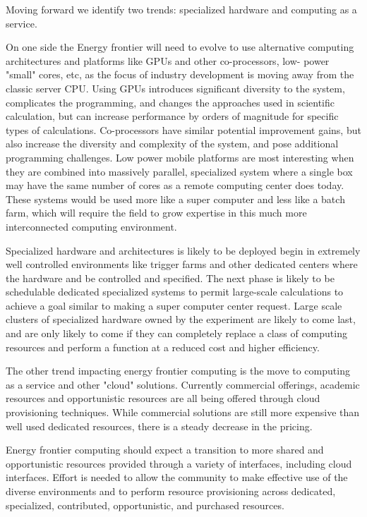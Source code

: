 Moving forward we identify two trends: specialized hardware and computing as a service.

On one side the Energy frontier will need to evolve to use alternative
computing architectures and platforms like GPUs and other co-processors, low-
power "small" cores, etc, as the focus of industry development is moving away
from the classic server CPU.  Using GPUs introduces significant diversity to
the system, complicates the programming, and changes the approaches used in
scientific calculation, but can increase performance by orders of magnitude
for specific types of calculations.  Co-processors have similar potential
improvement gains, but also increase the diversity and complexity of the system, and pose
additional programming challenges.  Low power mobile platforms are most
interesting when they are combined into massively parallel, specialized system
where a single box may have the same number of cores as a remote computing
center does today.  These systems would be used more like a super computer and
less like a batch farm, which will require the field to grow expertise in this
much more interconnected computing environment.

Specialized hardware and architectures is likely to be deployed begin in
extremely well controlled environments like trigger farms and other dedicated
centers where the hardware and be controlled and specified. The next phase is
likely to be schedulable dedicated specialized systems to permit large-scale
calculations to achieve a goal similar to making a super computer center
request.  Large scale clusters of specialized hardware owned by the experiment
are likely to come last, and are only likely to come if they can completely
replace a class of computing resources and perform a function at a reduced
cost and higher efficiency.

The other trend impacting energy frontier computing is the move to
computing as a service and other "cloud" solutions.  Currently
commercial offerings, academic resources and opportunistic resources
are all being offered through cloud provisioning techniques.  While
commercial solutions are still more expensive than well used dedicated
resources, there is a steady decrease in the pricing. 

Energy frontier
computing should expect a transition to more shared and opportunistic
resources provided through a variety of interfaces, including cloud interfaces.  
Effort is needed
to allow the community to make effective use of the diverse
environments and to perform resource provisioning across dedicated,
specialized, contributed, opportunistic, and purchased resources.

